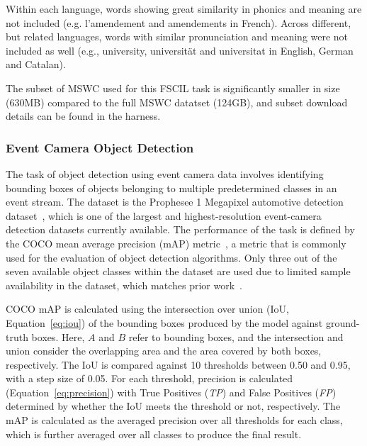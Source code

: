 Within each language, words showing great similarity in phonics and meaning are not included (e.g. l'amendement and amendements in French). Across different, but related languages, words with similar pronunciation and meaning were not included as well (e.g., university, universität and universitat in English, German and Catalan).

The subset of MSWC used for this FSCIL task is significantly smaller in size (630MB) compared to the full MSWC datatset (124GB), and subset download details can be found in the harness.


\subsubsection*{Event Camera Object Detection}
The task of object detection using event camera data involves identifying bounding boxes of objects belonging to multiple predetermined classes in an event stream. The dataset is the Prophesee 1 Megapixel automotive detection dataset~\cite{Perot2020}, which is one of the largest and highest-resolution event-camera detection datasets currently available. The performance of the task is defined by the COCO mean average precision (mAP) metric~\cite{LinCOCO_2014}, a metric that is commonly used for the evaluation of object detection algorithms. Only three out of the seven available object classes within the dataset are used due to limited sample availability in the dataset, which matches prior work~\cite{Perot2020}.

COCO mAP is calculated using the intersection over union (IoU, Equation~\ref{eq:iou}) of the bounding boxes produced by the model against ground-truth boxes. Here, $A$ and $B$ refer to bounding boxes, and the intersection and union consider the overlapping area and the area covered by both boxes, respectively. The IoU is compared against 10 thresholds between 0.50 and 0.95, with a step size of 0.05.
For each threshold, precision is calculated (Equation~\ref{eq:precision}) with True Positives (\textit{TP}) and False Positives (\textit{FP}) determined by whether the IoU meets the threshold or not, respectively. The mAP is calculated as the averaged precision over all thresholds for each class, which is further averaged over all classes to produce the final result.

